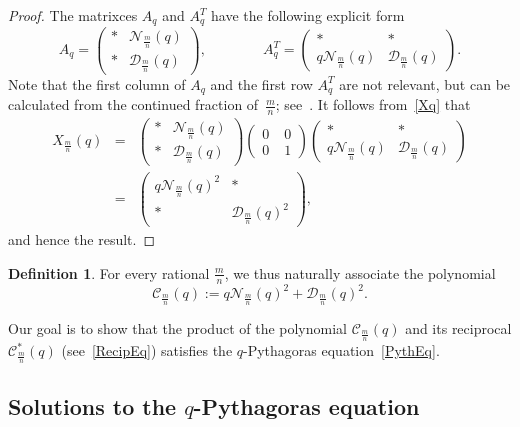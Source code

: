 \documentclass{article}[12pt]
\theoremstyle{plain}
\theoremstyle{definition}
\newtheorem{defn}[lem]{Definition}
\newcommand{\cC}{\mathcal{C}}
\newcommand{\cD}{\mathcal{D}}
\newcommand{\cN}{\mathcal{N}}
\begin{document}
\begin{proof}
The matrixces $A_q$ and $A_q^T$ have the following explicit form
$$
A_q=
\begin{pmatrix}
*&\cN_{\frac{m}{n}}(q)\\[4pt]
*&\cD_{\frac{m}{n}}(q)
\end{pmatrix},
\qquad\qquad
A_q^T=
\begin{pmatrix}
*&*\\[4pt]
q\cN_{\frac{m}{n}}(q)&\cD_{\frac{m}{n}}(q)
\end{pmatrix}.
$$
Note that the first column of $A_q$ and the first row $A_q^T$ 
are not relevant, but can be calculated from the continued fraction
of~$\frac{m}{n}$; see~\cite{MGOfmsigma}.
It follows from~\eqref{Xq} that
\begin{eqnarray*}
X_{\frac{m}{n}}(q) &=&
\begin{pmatrix}
*&\cN_{\frac{m}{n}}(q)\\[4pt]
*&\cD_{\frac{m}{n}}(q)
\end{pmatrix}
\begin{pmatrix}
0&\;0\\[4pt]
0&\;1
\end{pmatrix}
\begin{pmatrix}
*&*\\[4pt]
q\cN_{\frac{m}{n}}(q)&\cD_{\frac{m}{n}}(q)
\end{pmatrix}\\[6pt]
&=&
\begin{pmatrix}
q\cN_{\frac{m}{n}}(q)^2&*\\[4pt]
*&\cD_{\frac{m}{n}}(q)^2
\end{pmatrix},
\end{eqnarray*}
and hence the result.
\end{proof}

\begin{defn}
For every rational $\frac{m}{n}$, we thus naturally associate the polynomial
$$
\cC_{\frac{m}{n}}(q):=q\cN_{\frac{m}{n}}(q)^2+\cD_{\frac{m}{n}}(q)^2.
$$
\end{defn}

Our goal is to show that the product of the polynomial $\cC_{\frac{m}{n}}(q)$ 
and its reciprocal $\cC^*_{\frac{m}{n}}(q)$ (see~\eqref{RecipEq}) satisfies the 
$q$-Pythagoras equation~\eqref{PythEq}.


\subsection{Solutions to the $q$-Pythagoras equation}\label{qPitSec}
\end{document}
